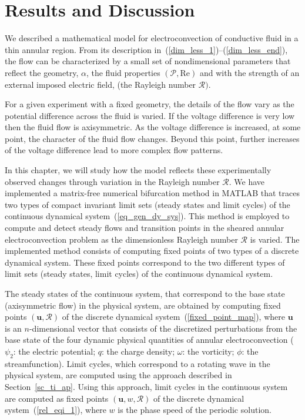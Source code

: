 \chapter{Results and Discussion} \label{ch_result}
We described a mathematical model for electroconvection of conductive fluid in a thin annular region. From its description in~(\ref{dim_less_1})--(\ref{dim_less_end}), the flow can be characterized by a small set of nondimensional parameters that reflect the geometry, $\alpha$, the fluid properties $(\mathcal{P}, \mathrm{Re})$ and with the strength of an external imposed electric field, (the Rayleigh number $\mathcal{R})$.

For a given experiment with a fixed geometry, the details of the flow vary as the potential difference across the fluid is varied. If the voltage difference is very low then the fluid flow is axisymmetric. As the voltage difference is increased, at some point, the character of the fluid flow changes. Beyond this point, further increases  of the voltage difference lead to more complex flow patterns.

In this chapter, we will study how the model reflects these experimentally observed changes through variation in the Rayleigh number $\mathcal{R}$. We have implemented a matrix-free numerical bifurcation method in MATLAB that traces two types of compact invariant limit sets (steady states and limit cycles) of the continuous dynamical system~(\ref{eq_gen_dy_sys}). This method is employed to compute and detect steady flows and transition points in the sheared annular electroconvection problem as the dimensionless Rayleigh number $\mathcal{R}$ is varied.
The implemented method consists of computing fixed points of two types of a discrete dynamical system. These fixed points correspond to the two different types of limit sets (steady states, limit cycles) of the continuous dynamical system.

The steady states of the continuous system, that correspond to the base state (axisymmetric flow) in the physical system, are obtained by computing fixed points $(\mathbf{u},\mathcal{R})$ of the discrete dynamical system~(\ref{fixed_point_map}), where $\mathbf{u}$ is an $n$-dimensional vector that consists of the discretized perturbations from the base state of the four dynamic physical quantities of annular electroconvection ($\psi_2$: the electric potential; $q$: the charge density; $\omega$: the vorticity; $\phi$: the streamfunction).
Limit cycles, which correspond to a rotating wave in the physical system, are computed using the approach described in Section~\ref{sc_ti_ap}. Using this approach, limit cycles in the continuous system are computed as fixed points $(\mathbf{u},w,\mathcal{R})$ of the discrete dynamical system~(\ref{rel_eqi_1}), where $w$ is the phase speed of the periodic solution.

